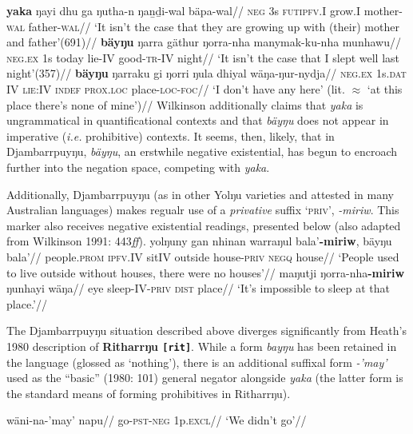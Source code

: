 \documentclass[10.5pt]{article}
\begin{document}
\pex
\a\begingl
\gla \textbf{yaka} ŋayi dhu ga ŋutha-n ŋaṉḏi-wal bäpa-wal//
\glb \textsc{neg} 3s \textsc{fut}\textsc{ipfv.I} grow.I mother\textsc{-wal} father\textsc{-wal}//
\glft `It isn't the case that they are growing up with (their) mother and father'\hfill(691)//
\endgl
\a\begingl
\gla \textbf{bäyŋu} ŋarra gäthur ŋorra-nha manymak-ku-nha munhawu//
\glb \textsc{neg.ex} 1s today lie\textsc{-IV} good-\textsc{tr-IV} night//
\glft `It isn't the case that I slept well last night'\hfill(357)//
\endgl\xe
\pex
\begingl
\gla \textbf{bäyŋu} ŋarraku gi ŋorri ŋula dhiyal wäŋa-ŋur-nydja//
\glb \textsc{neg.ex} 1s\textsc{.dat} \textsc{IV} \textsc{lie:IV} \textsc{indef} \textsc{prox.loc} place-\textsc{loc-foc}//
\glft`I don't have any here' (lit. $\approx$ `at this place there's none of mine')//
\endgl
\xe
Wilkinson additionally claims that \textit{yaka} is ungrammatical in quantificational contexts and that \textit{bäyŋu} does not appear in imperative (\textit{i.e.} prohibitive) contexts. It seems, then, likely, that in Djambarrpuyŋu, \textit{bäyŋu}, an erstwhile negative existential, has begun to encroach further into the negation space, competing with \textit{yaka}.

Additionally, Djambarrpuyŋu (as in other Yolŋu varieties and attested in many Australian languages) makes regualr use of a \textit{privative} suffix \textsc{`priv'}, \textit{-miriw}. This marker also receives negative existential readings, presented below (also adapted from Wilkinson 1991: 443\textit{ff}).
\pex
\a\begingl
\gla yolŋuny gan nhinan warraŋul bala'\textbf{-miriw}, bäyŋu bala'//
\glb people.\textsc{prom} \textsc{ipfv.IV} sit\textsc{IV} outside house\textsc{-priv} \textsc{negq} house//
\glft `People used to live outside without houses, there were no houses'//
\endgl
\a\begingl
\gla maŋutji ŋorra-nha\textbf{-miriw} ŋunhayi wäŋa//
\glb eye sleep-IV\textsc{-priv} \textsc{dist} place//
\glft`It's impossible to sleep at that place.'//\endgl
\xe

The Djambarrpuyŋu situation described above diverges significantly from Heath's 1980 description of {\bf Ritharrŋu {\tt[rit]}}. While a form \textit{bayŋu} has been retained in the language (glossed as `nothing'), there is an additional suffixal form \textit{-'may'} used as the ``basic'' (1980: 101) general negator alongside \textit{yaka} (the latter form is the standard means of forming prohibitives in Ritharrŋu).

\pex
\begingl\gla wäni-na-'may' napu//
\glb go-\textsc{pst-neg} 1p\textsc{.excl}//
\glft `We didn't go'//
\endgl\xe
\end{document}
